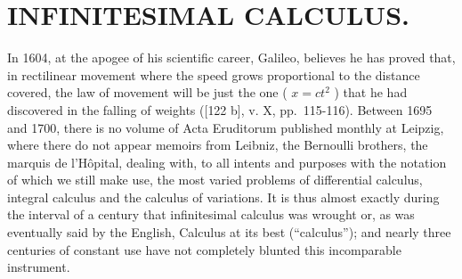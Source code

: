 \chapter{INFINITESIMAL CALCULUS.}

In 1604, at the apogee of his scientific career, Galileo, believes he has proved that, in rectilinear movement where the speed grows proportional to the distance covered, the law of movement will be just the one ( \(x = ct^{2}\) ) that he had discovered in the falling of weights ({[}122 b{]}, v. X, pp.~115-116). Between 1695 and 1700, there is no volume of Acta Eruditorum published monthly at Leipzig, where there do not appear memoirs from Leibniz, the Bernoulli brothers, the marquis de l'Hôpital, dealing with, to all intents and purposes with the notation of which we still make use, the most varied problems of differential calculus, integral calculus and the calculus of variations. It is thus almost exactly during the interval of a century that infinitesimal calculus was wrought or, as was eventually said by the English, Calculus at its best (``calculus''); and nearly three centuries of constant use have not completely blunted this incomparable instrument.

